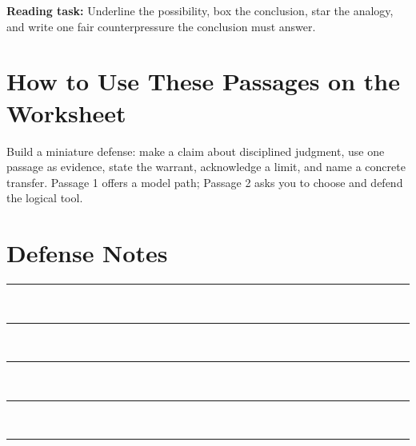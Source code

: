 \documentclass[12pt]{article}
\begin{document}
\textbf{Reading task:} Underline the possibility, box the conclusion, star the analogy, and write one fair counterpressure the conclusion must answer.

\section*{How to Use These Passages on the Worksheet}
Build a miniature defense: make a claim about disciplined judgment, use one passage as evidence, state the warrant, acknowledge a limit, and name a concrete transfer. Passage 1 offers a model path; Passage 2 asks you to choose and defend the logical tool.

\vfill
\section*{Defense Notes}
\noindent\rule{\textwidth}{0.4pt}\\[1.0em]
\rule{\textwidth}{0.4pt}\\[1.0em]
\rule{\textwidth}{0.4pt}\\[1.0em]
\rule{\textwidth}{0.4pt}\\[1.0em]
\rule{\textwidth}{0.4pt}
\end{document}
